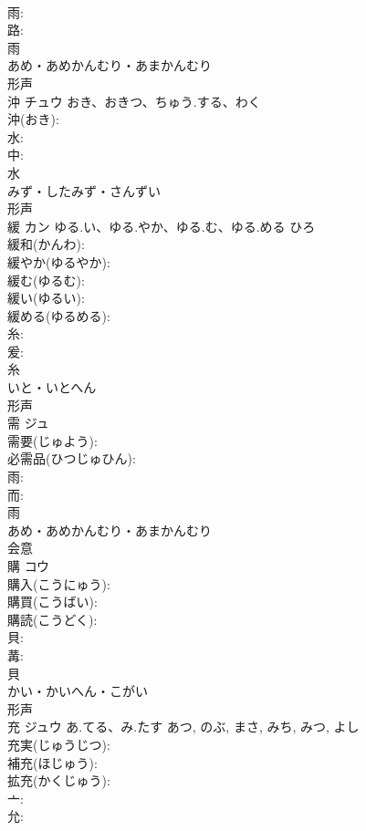 \documentclass[8pt]{extreport}
\begin{document}
\begin{CJK}{UTF8}{min}
\\	雨: 
\\	路: 
\\	雨	
\\	あめ・あめかんむり・あまかんむり	
\\	形声 
\\	沖	チュウ	おき、おきつ、ちゅう.する、わく		
\\	沖(おき): 
\\	水: 
\\	中: 
\\	水	
\\	みず・したみず・さんずい	
\\	形声 
\\	緩	カン	ゆる.い、ゆる.やか、ゆる.む、ゆる.める	ひろ	
\\	緩和(かんわ): 
\\	緩やか(ゆるやか): 
\\	緩む(ゆるむ): 
\\	緩い(ゆるい): 
\\	緩める(ゆるめる): 
\\	糸: 
\\	爰: 
\\	糸	
\\	いと・いとへん	
\\	形声 
\\	需	ジュ			
\\	需要(じゅよう): 
\\	必需品(ひつじゅひん): 
\\	雨: 
\\	而: 
\\	雨	
\\	あめ・あめかんむり・あまかんむり	
\\	会意 
\\	購	コウ			
\\	購入(こうにゅう): 
\\	購買(こうばい): 
\\	購読(こうどく): 
\\	貝: 
\\	冓: 
\\	貝	
\\	かい・かいへん・こがい	
\\	形声 
\\	充	ジュウ	あ.てる、み.たす	あつ, のぶ, まさ, みち, みつ, よし	
\\	充実(じゅうじつ): 
\\	補充(ほじゅう): 
\\	拡充(かくじゅう): 
\\	亠: 
\\	允: 

\end{CJK}
\end{document}
